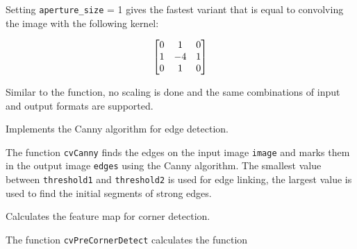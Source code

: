 Setting \texttt{aperture\_size} = 1 gives the fastest variant that is equal to convolving the image with the following kernel:

\[ \begin{bmatrix} 0 & 1 & 0\\ 1 & -4 & 1\\ 0 & 1 & 0 \end{bmatrix} \]

Similar to the  function, no scaling is done and the same combinations of input and output formats are supported.

\label{Canny}
Implements the Canny algorithm for edge detection.

\begin{description}
\end{description}

The function \texttt{cvCanny} finds the edges on the input image \texttt{image} and marks them in the output image \texttt{edges} using the Canny algorithm. The smallest value between \texttt{threshold1} and \texttt{threshold2} is used for edge linking, the largest value is used to find the initial segments of strong edges.

\label{PreCornerDetect}
Calculates the feature map for corner detection.

\begin{description}
\end{description}

The function \texttt{cvPreCornerDetect} calculates the function

